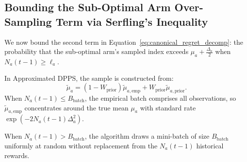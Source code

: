 \documentclass[twoside]{article}
\begin{document}
\subsection{Bounding the Sub-Optimal Arm Over-Sampling Term via Serfling's Inequality}
We now bound the second term in Equation~\eqref{eq:canonical_regret_decomp}: the probability that the sub-optimal arm's sampled index exceeds $\mu_a + \frac{\Delta_a}{2}$ when $N_a(t-1) \ge \ell_a$.

In Approximated DPPS, the sample is constructed from:
\begin{equation}
\tilde{\mu}_a = (1 - W_{\text{prior}}) \tilde{\mu}_{a, \text{emp}} + W_{\text{prior}} \tilde{\mu}_{a, \text{prior}}.
\end{equation}
When $N_a(t-1) \le B_{\text{batch}}$, the empirical batch comprises all observations, so $\tilde{\mu}_{a, \text{emp}}$ concentrates around the true mean $\mu_a$ with standard rate $\exp(- 2 N_a(t-1) \Delta_a^2)$.

When $N_a(t-1) > B_{\text{batch}}$, the algorithm draws a mini-batch of size $B_{\text{batch}}$ uniformly at random without replacement from the $N_a(t-1)$ historical rewards. 
\end{document}
